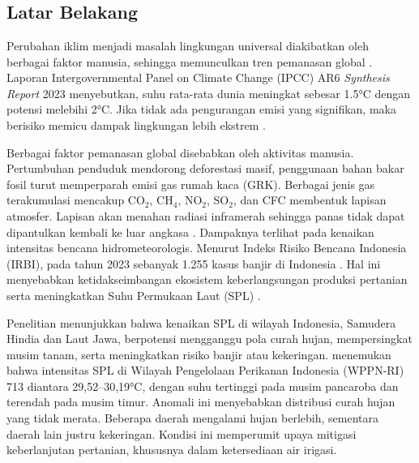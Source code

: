 \chapter{\babSatu}
\thispagestyle{fancy}
\section{Latar Belakang}
    Perubahan iklim menjadi masalah lingkungan universal diakibatkan oleh berbagai faktor manusia, sehingga memunculkan tren pemanasan global \parencite{rahmayanti2022}. Laporan Intergovernmental Panel on Climate Change (IPCC) AR6 \textit{Synthesis Report} 2023 menyebutkan, suhu rata-rata dunia meningkat sebesar 1.5°C dengan potensi melebihi 2°C. Jika tidak ada pengurangan emisi yang signifikan, maka berisiko memicu dampak lingkungan lebih ekstrem \parencite{ipcc2023}. 
    
    Berbagai faktor pemanasan global disebabkan oleh aktivitas manusia. Pertumbuhan penduduk mendorong deforestasi masif, penggunaan bahan bakar fosil turut memperparah emisi gas rumah kaca (GRK). Berbagai jenis gas terakumulasi mencakup CO$_2$, CH$_4$, NO$_2$, SO$_2$, dan CFC membentuk lapisan atmosfer. Lapisan akan menahan radiasi inframerah sehingga panas tidak dapat dipantulkan kembali ke luar angkasa \parencite{azadi2021}. Dampaknya terlihat pada kenaikan intensitas bencana hidrometeorologis. Menurut Indeks Risiko Bencana Indonesia (IRBI), pada tahun 2023 sebanyak 1.255 kasus banjir di Indonesia \parencite{bnpb2024}. Hal ini menyebabkan ketidakseimbangan ekosistem keberlangsungan produksi pertanian serta meningkatkan Suhu Permukaan Laut (SPL) \parencite{malau2023}.
        
    Penelitian menunjukkan bahwa kenaikan SPL di wilayah Indonesia, Samudera Hindia dan Laut Jawa, berpotensi mengganggu pola curah hujan, mempersingkat musim tanam, serta meningkatkan risiko banjir atau kekeringan. \textcite{yusuf2022} menemukan bahwa intensitas SPL di Wilayah Pengelolaan Perikanan Indonesia (WPPN-RI) 713 diantara 29,52–30,19°C, dengan suhu tertinggi pada musim pancaroba dan terendah pada musim timur. Anomali ini menyebabkan distribusi curah hujan yang tidak merata. Beberapa daerah mengalami hujan berlebih, sementara daerah lain justru kekeringan. Kondisi ini memperumit upaya mitigasi keberlanjutan pertanian, khususnya dalam ketersediaan air irigasi.

